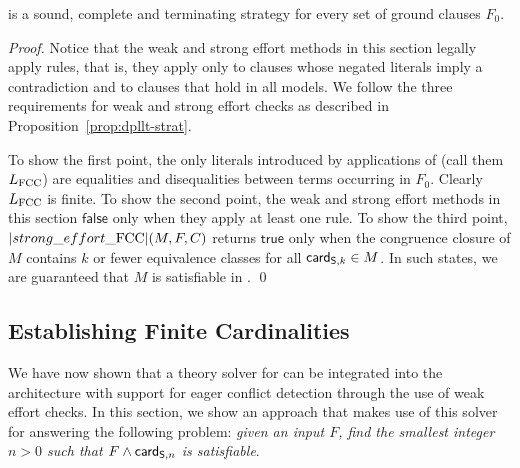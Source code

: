 \documentclass{svjour3}                     %
\begin{document}
\begin{thm}
\label{thm:fcc-dpllts-correct}
\checkfcc is a sound, complete and terminating strategy 
for every set of ground clauses $F_0$.
\end{thm}
\begin{proof}
Notice that the weak and strong effort methods in this section legally apply \dpllts rules, that is,
they apply  only to clauses whose negated literals imply a contradiction
and  to clauses that hold in all models.
We follow the three requirements for weak and strong effort checks as described in Proposition~\ref{prop:dpllt-strat}.

To show the first point, the only literals introduced by applications of  (call them $L_\fcc$)
are equalities and disequalities between terms occurring in $F_0$.
Clearly $L_\fcc$ is finite.
To show the second point, the weak and strong effort methods in this section $\mathsf{false}$ only when they apply at least one rule.
To show the third point, $|strong\_effort\_\fcc|( M, F, C )$ returns $\mathsf{true}$ only
when the congruence closure of $M$ contains $k$ or fewer equivalence classes for all $\card[\So,k] \in M$.
In such states, we are guaranteed that $M$ is satisfiable in \fcc.
\qed
\end{proof}

\subsection{Establishing Finite Cardinalities} 
\label{sec:fcc-min-card}

We have now shown that a theory solver for \fcc can be integrated into the \dpllts architecture
with support for eager conflict detection through the use of weak effort checks.
In this section, we show an approach that makes use of this solver 
for answering the following problem:
\emph{given an input $F$, find the smallest integer $n > 0$ 
such that $F \wedge \card[\So,n]$ is satisfiable}.
\end{document}
